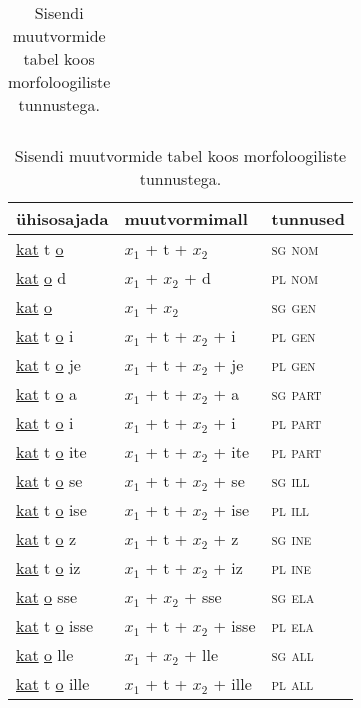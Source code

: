 \documentclass[12pt,a4paper]{article}
\begin{document}
\begin{table}[H]
\begin{minipage}[t]{.40\textwidth}
\begin{tabular}[t]{l l}
    \end{tabular}
    \caption{Sisendi muutvormide tabel koos morfo\-loogiliste tunnustega.}
    \label{tab:sisendtabel-katto}
  \end{minipage}
  \hfill
  \begin{minipage}[t]{.55\textwidth}
    \centering
    \begin{tabular}[t]{l l l}
      ühisosajada                     & muutvormi\-mall           & tunnused \\
      \hline
      \underline{kat} t \underline{o}       & $x_1$ + t + $x_2$         & \textsc{sg nom} \\
      \underline{kat}   \underline{o} d     & $x_1$ + $x_2$ + d         & \textsc{pl nom} \\
      \underline{kat}   \underline{o}       & $x_1$ + $x_2$             & \textsc{sg gen} \\
      \underline{kat} t \underline{o} i     & $x_1$ + t + $x_2$ + i     & \textsc{pl gen} \\
      \underline{kat} t \underline{o} je    & $x_1$ + t + $x_2$ + je    & \textsc{pl gen} \\
      \underline{kat} t \underline{o} a     & $x_1$ + t + $x_2$ + a     & \textsc{sg part} \\
      \underline{kat} t \underline{o} i     & $x_1$ + t + $x_2$ + i     & \textsc{pl part} \\
      \underline{kat} t \underline{o} ite   & $x_1$ + t + $x_2$ + ite   & \textsc{pl part} \\
      \underline{kat} t \underline{o} se    & $x_1$ + t + $x_2$ + se    & \textsc{sg ill} \\
      \underline{kat} t \underline{o} ise   & $x_1$ + t + $x_2$ + ise   & \textsc{pl ill} \\
      \underline{kat} t \underline{o} z     & $x_1$ + t + $x_2$ + z     & \textsc{sg ine} \\
      \underline{kat} t \underline{o} iz    & $x_1$ + t + $x_2$ + iz    & \textsc{pl ine} \\
      \underline{kat}   \underline{o} sse   & $x_1$ + $x_2$ + sse       & \textsc{sg ela} \\
      \underline{kat} t \underline{o} isse  & $x_1$ + t + $x_2$ + isse  & \textsc{pl ela} \\
      \underline{kat}   \underline{o} lle   & $x_1$ + $x_2$ + lle       & \textsc{sg all} \\
      \underline{kat} t \underline{o} ille  & $x_1$ + t + $x_2$ + ille  & \textsc{pl all} \\

\end{tabular}
\end{minipage}
\end{table}
\end{document}
